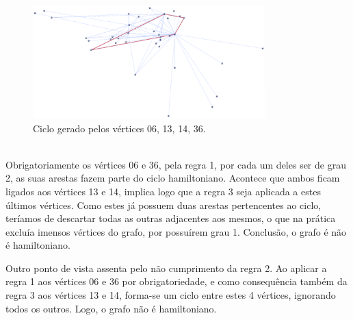 \begin{figure}[h]
    \centering
    \includegraphics[width=0.8\textwidth]{imgs/Figura13}
    \caption{Ciclo gerado pelos vértices 06, 13, 14, 36.\label{fig:imagem13}}
\end{figure}\\
\linebreak
\indent Obrigatoriamente os vértices 06 e 36, pela regra 1, por cada um deles ser de grau 2, as suas arestas fazem 
parte do ciclo hamiltoniano. Acontece que ambos ficam ligados aos vértices 13 e 14, implica logo que a regra 3 
seja aplicada a estes últimos vértices. Como estes já possuem duas arestas pertencentes ao ciclo, teríamos de 
descartar todas as outras adjacentes aos mesmos, o que na prática excluía imensos vértices do grafo, por 
possuírem grau 1. Conclusão, o grafo é não é hamiltoniano.\par
Outro ponto de vista assenta pelo não cumprimento da regra 2. Ao aplicar a regra 1 aos vértices 06 e 36 
por obrigatoriedade, e como consequência também da regra 3 aos vértices 13 e 14, forma-se um ciclo entre 
estes 4 vértices, ignorando todos os outros. Logo, o grafo não é hamiltoniano.
